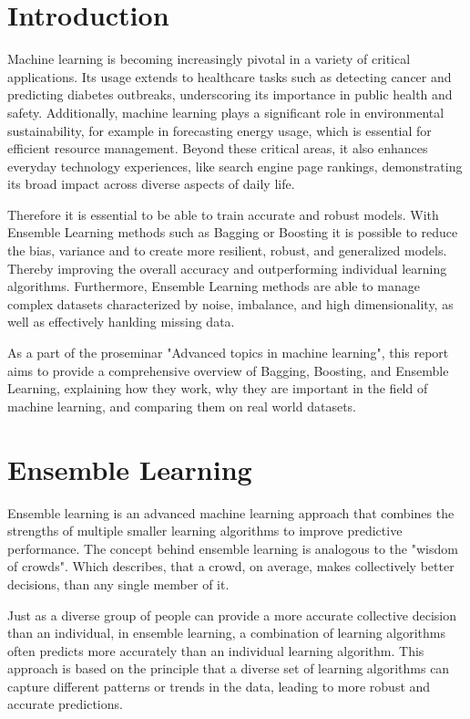\section{Introduction}
Machine learning is becoming increasingly pivotal in a variety of critical
applications. Its usage extends to healthcare tasks such as detecting cancer
and predicting diabetes outbreaks, underscoring its importance in public
health and safety. Additionally, machine learning plays a significant role
in environmental sustainability, for example in forecasting energy usage,
which is essential for efficient resource management. Beyond these critical
areas, it also enhances everyday technology experiences, like search engine page 
rankings, demonstrating its broad impact across diverse aspects of daily life.

Therefore it is essential to be able to train accurate and robust models. With
Ensemble Learning methods such as Bagging or Boosting it is possible to reduce the 
bias, variance and to create more resilient, robust, and generalized models. 
Thereby improving the overall accuracy and outperforming individual learning 
algorithms.
Furthermore, Ensemble Learning methods are able to manage complex datasets
characterized by noise, imbalance, and high dimensionality, as well as effectively
hanlding missing data.

As a part of the proseminar "Advanced topics in machine learning", this report
aims to provide a comprehensive overview of Bagging, Boosting, and Ensemble 
Learning, explaining how they work, why they are important in the field of 
machine learning, and comparing them on real world datasets.

\section{Ensemble Learning}

Ensemble learning is an advanced machine learning approach that combines the 
strengths of multiple smaller learning algorithms to improve predictive 
performance. 
The concept behind ensemble learning is analogous to the "wisdom of crowds".
Which describes, that a crowd, on average, makes collectively better decisions,
than any single member of it.

Just as a diverse group of people can provide a more accurate collective decision 
than an individual, in ensemble learning, a combination of learning algorithms
often predicts more accurately than an individual learning algorithm.
This approach is based on the principle that a diverse set of learning algorithms
can capture different patterns or trends in the data, leading to more robust and 
accurate predictions.


